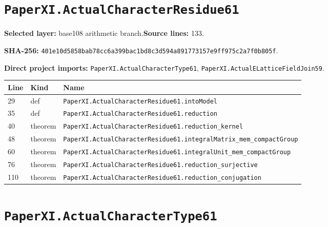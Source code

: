 \documentclass[10pt,oneside]{book}
\begin{document}
\section{\texorpdfstring{\nolinkurl{PaperXI.ActualCharacterResidue61}}{PaperXI.ActualCharacterResidue61}}\label{module:PaperXI.ActualCharacterResidue61}

\textbf{Selected layer:} base108 arithmetic branch.\quad\textbf{Source lines:} 133.\par\textbf{SHA-256:} {\scriptsize\nolinkurl{401e10d5858bab78cc6a399bac1bd8c3d594a891773157e9ff975c2a7f0b805f}}.


\textbf{Direct project imports:} \nolinkurl{PaperXI.ActualCharacterType61}, \nolinkurl{PaperXI.ActualELatticeFieldJoin59}.

\begin{longtable}{@{}p{}p{}p{}@{}}\toprule Line&Kind&Name\\\midrule\endhead

29&def&\nolinkurl{PaperXI.ActualCharacterResidue61.intoModel}\\

35&def&\nolinkurl{PaperXI.ActualCharacterResidue61.reduction}\\

40&theorem&\nolinkurl{PaperXI.ActualCharacterResidue61.reduction_kernel}\\

48&theorem&\nolinkurl{PaperXI.ActualCharacterResidue61.integralMatrix_mem_compactGroup}\\

60&theorem&\nolinkurl{PaperXI.ActualCharacterResidue61.integralUnit_mem_compactGroup}\\

76&theorem&\nolinkurl{PaperXI.ActualCharacterResidue61.reduction_surjective}\\

110&theorem&\nolinkurl{PaperXI.ActualCharacterResidue61.reduction_conjugation}\\

\bottomrule\end{longtable}

\section{\texorpdfstring{\nolinkurl{PaperXI.ActualCharacterType61}}{PaperXI.ActualCharacterType61}}\label{module:PaperXI.ActualCharacterType61}
\end{document}
